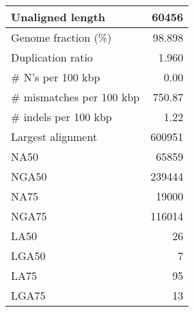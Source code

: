 \documentclass[12pt,a4paper]{article}
\begin{document}
\begin{table}[ht]
\begin{center}
\begin{tabular}{|l*{1}{|r}|}
Unaligned length & 60456 \\ \hline
Genome fraction (\%) & 98.898 \\ \hline
Duplication ratio & 1.960 \\ \hline
\# N's per 100 kbp & 0.00 \\ \hline
\# mismatches per 100 kbp & 750.87 \\ \hline
\# indels per 100 kbp & 1.22 \\ \hline
Largest alignment & 600951 \\ \hline
NA50 & 65859 \\ \hline
NGA50 & 239444 \\ \hline
NA75 & 19000 \\ \hline
NGA75 & 116014 \\ \hline
LA50 & 26 \\ \hline
LGA50 & 7 \\ \hline
LA75 & 95 \\ \hline
LGA75 & 13 \\ \hline
\end{tabular}
\end{center}
\end{table}
\end{document}
